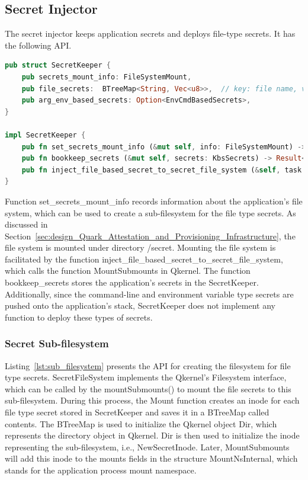 \subsection{Secret Injector}
The secret injector keeps application secrets and deploys file-type secrets. It has the following API. 
\begin{lstlisting}[language=rust, caption= API for Secret Injector, label={lst:Secret_injector}]
pub struct SecretKeeper {
    pub secrets_mount_info: FileSystemMount,
    pub file_secrets:  BTreeMap<String, Vec<u8>>,  // key: file name, value: secret
    pub arg_env_based_secrets: Option<EnvCmdBasedSecrets>,
}

impl SecretKeeper {
    pub fn set_secrets_mount_info (&mut self, info: FileSystemMount) -> Result<()>
    pub fn bookkeep_secrets (&mut self, secrets: KbsSecrets) -> Result<()>
    pub fn inject_file_based_secret_to_secret_file_system (&self, task: &Task) -> Result<()>
}   
\end{lstlisting}

Function set\_secrets\_mount\_info records information about the application's file system, which can be used to create a sub-filesystem for the file type secrets. As discussed in Section~\ref{sec:design_Quark_Attestation_and_Provisioning_Infrastructure}, the file system is mounted under directory 
/secret. Mounting the file system is facilitated by the function inject\_file\_based\_secret\_to\_secret\_file\_system, which calls the function MountSubmounts in Qkernel. The function bookkeep\_secrets stores the application's secrets in the SecretKeeper. Additionally, since the command-line and environment variable type secrets are pushed onto the application's 
stack,  SecretKeeper does not implement any function to deploy these types of secrets.

\subsubsection{Secret Sub-filesystem}
Listing~\ref{lst:sub_filesystem} presents the API for creating the filesystem for file type secrets. SecretFileSystem implements the  Qkernel's Filesystem interface, which can be called by the mountSubmounts() to mount the file secrets to this sub-filesystem.  During this process, 
the Mount function creates an inode for each file type secret stored in SecretKeeper and saves it in a BTreeMap called contents. The BTreeMap is used to initialize the Qkernel object Dir, which represents the directory object in Qkernel. Dir is then used to initialize the inode 
representing the sub-filesystem, i.e., NewSecretInode. Later, MountSubmounts will add this inode to the mounts fields in the structure MountNsInternal, which stands for the application process mount namespace.

